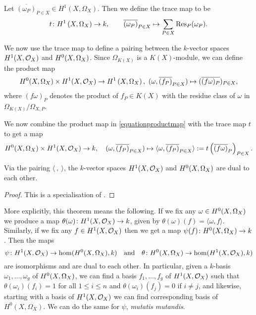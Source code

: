     \begin{defn}
    Let $\overline{(\omega_P)}_{P \in X} \in H^1(X,\Omega_X)$.
    Then we define the trace map to be 
        \[
    t \colon H^1\left(X, \Omega_X\right) \rightarrow k, \qquad \overline{(\omega_P)}_{P \in X}  \mapsto \sum_{P \in X} \operatorname{Res}_P(\omega_P).
        \]
    \end{defn}

We now use the trace map to define a pairing between the $k$-vector spaces $H^1(X,\mathcal{O}_X)$ and ${H^0(X,\Omega_X)}$.
Since $\Omega_{K(X)}$ is a $K(X)$-module, we can define the product map 
    \begin{equation}\label{equationproductmap}
    {H^0(X,\Omega_X)} \times H^1(X,\mathcal{O}_X) \rightarrow H^1\left(X, \Omega_X\right), \ (\omega, \overline{(f_P)}_{P \in X}) \mapsto ( \overline {(f  \omega)_P})_{P \in X},
    \end{equation}
where $(f\omega)_P$ denotes the product of $f_P \in K(X)$ with the residue class of $\omega$ in $\Omega_{K(X)}/\Omega_{X,P}$.

We now combine the product map in \eqref{equationproductmap} with the trace map $t$ to get a map 
    \[
    {H^0(X,\Omega_X)} \times H^1(X,\mathcal{O}_X) \rightarrow k,\quad (\omega, \overline{(f_P)}_{P \in X}) \mapsto \langle \omega, \overline{(f_P)}_{P \in X} \rangle := t \left( \overline{(f \omega)}_P \right)_{P \in X}.
    \]

    \begin{thm}\label{theoremserreduality}
    Via the pairing $\langle\ ,\ \rangle$, the $k$-vector spaces $H^1(X,\mathcal{O}_X)$ and ${H^0(X,\Omega_X)}$ are dual to each other.
    \end{thm}
    \begin{proof}
    This is a specialisation of \cite[Chap.\ II, Thm.\ 2]{algebraicgroupsandclassfields}.
    \end{proof}

More explicitly, this theorem means the following.
If we fix any $\omega \in {H^0(X,\Omega_X)}$ we produce a map $\theta(\omega)\colon H^1(X,\mathcal{O}_X) \rightarrow k$, given by $\theta(\omega)(f) = \langle \omega , f\rangle$.
Similarly, if we fix any $f \in H^1(X,\mathcal{O}_X)$ then we get a map $\psi(f) \colon {H^0(X,\Omega_X)} \rightarrow k$.
Then the maps 
    \[
    \psi \colon H^1(X,\mathcal{O}_X) \rightarrow \hom(H^0(X,\Omega_X),k) \quad
    \text{and} \quad    
    \theta \colon H^0(X,\Omega_X) \rightarrow \hom(H^1(X,\mathcal{O}_X), k)
    \]
are isomorphisms and are dual to each other.
In particular, given a $k$-basis $\omega_1, \ldots, \omega_g$ of ${H^0(X,\Omega_X)}$, we can find a basis $f_1, \ldots , f_g$ of $H^1(X,\mathcal{O}_X)$ such that $\theta(\omega_i)(f_i) = 1$ for all $1 \leq i \leq n$ and $\theta(\omega_i)(f_j) = 0$ if $i \neq j$, and likewise, starting with a basis of $H^1(X,\mathcal{O}_X)$ we can find corresponding basis of $H^0(X,\Omega_X)$. 
We can do the same for $\psi$, {\em mutatis mutandis}.


